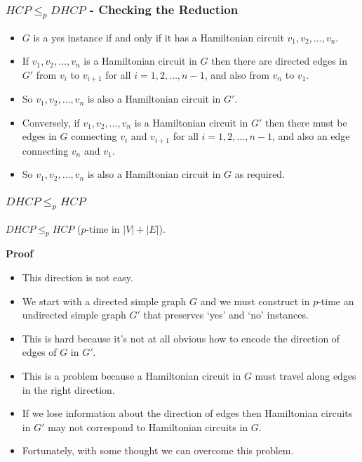 \documentclass[handout]{beamer}
\begin{document}
\begin{frame}
\frametitle{$HCP\leq_p DHCP$ - Checking the Reduction}
\begin{itemize}
\item $G$ is a yes instance if and only if it has a Hamiltonian circuit $v_1,v_2,\ldots,v_n$. 
\vspace{0.3cm}
\item If $v_1,v_2,\ldots,v_n$ is a Hamiltonian circuit in $G$ then there are directed edges in $G'$ from $v_i$ to $v_{i+1}$ for all $i=1,2,\ldots,n-1$, and also from $v_n$ to $v_1$. 
\vspace{0.3cm}
\item So $v_1,v_2,\ldots,v_n$ is also a Hamiltonian circuit in $G'$. 
\vspace{0.3cm}
\item Conversely, if $v_1,v_2,\ldots,v_n$ is a Hamiltonian circuit in $G'$ then there must be edges in $G$ connecting $v_i$ and $v_{i+1}$ for all $i=1,2,\ldots,n-1$, and also an edge connecting $v_n$ and $v_1$. 
\vspace{0.3cm}
\item So $v_1,v_2,\ldots,v_n$ is also a Hamiltonian circuit in $G$ as required.    
\end{itemize} 
\end{frame}

\begin{frame}
\frametitle{$DHCP\leq_p HCP$}

\begin{theorem}
$DHCP\leq_p HCP$ ($p$-time in $|V|+|E|$).
\end{theorem}
\vspace{0.3cm}
\textbf{Proof}
\begin{itemize}
\item This direction is not easy. 
\vspace{0.3cm}
\item We start with a directed simple graph $G$ and we must construct in $p$-time an undirected  simple graph $G'$ that preserves `yes' and `no' instances. 
\vspace{0.3cm}
\item This is hard because it's not at all obvious how to encode the direction of edges of $G$ in $G'$. 
\vspace{0.3cm}
\item This is a problem because a Hamiltonian circuit in $G$ must travel along edges in the right direction. 
\vspace{0.3cm}
\item If we lose information about the direction of edges then Hamiltonian circuits in $G'$ may not correspond to Hamiltonian circuits in $G$. 
\vspace{0.3cm}
\item Fortunately, with some thought we can overcome this problem.  
\end{itemize} 
\end{frame}
\end{document}
